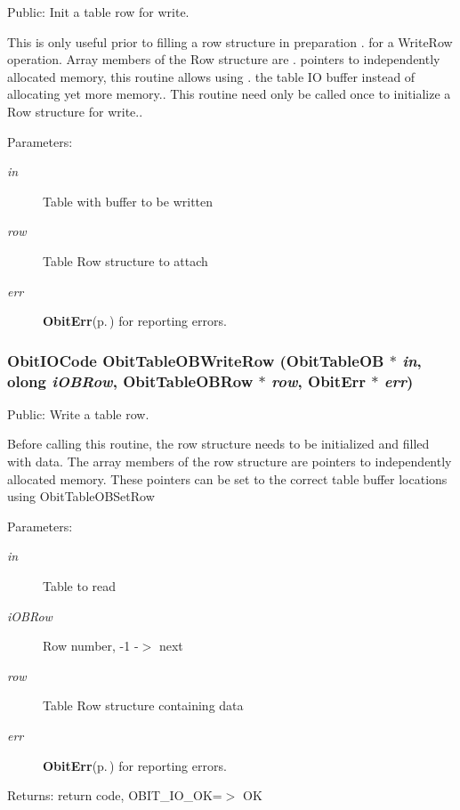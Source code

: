 Public: Init a table row for write. 

This is only useful prior to filling a row structure in preparation . for a Write\-Row operation. Array members of the Row structure are . pointers to independently allocated memory, this routine allows using . the table IO buffer instead of allocating yet more memory.. This routine need only be called once to initialize a Row structure for write.. \begin{Desc}
\item[Parameters:]
\begin{description}
\item[{\em in}]Table with buffer to be written \item[{\em row}]Table Row structure to attach \item[{\em err}]{\bf Obit\-Err}{\rm (p.\,\pageref{structObitErr})} for reporting errors. \end{description}
\end{Desc}
\subsubsection{\setlength{\rightskip}{0pt plus 5cm}Obit\-IOCode Obit\-Table\-OBWrite\-Row ({\bf Obit\-Table\-OB} $\ast$ {\em in}, {\bf olong} {\em i\-OBRow}, {\bf Obit\-Table\-OBRow} $\ast$ {\em row}, {\bf Obit\-Err} $\ast$ {\em err})}\label{ObitTableOB_8h_a20}


Public: Write a table row. 

Before calling this routine, the row structure needs to be initialized and filled with data. The array members of the row structure are pointers to independently allocated memory. These pointers can be set to the correct table buffer locations using Obit\-Table\-OBSet\-Row \begin{Desc}
\item[Parameters:]
\begin{description}
\item[{\em in}]Table to read \item[{\em i\-OBRow}]Row number, -1 -$>$ next \item[{\em row}]Table Row structure containing data \item[{\em err}]{\bf Obit\-Err}{\rm (p.\,\pageref{structObitErr})} for reporting errors. \end{description}
\end{Desc}
\begin{Desc}
\item[Returns:]return code, OBIT\_\-IO\_\-OK=$>$ OK \end{Desc}
